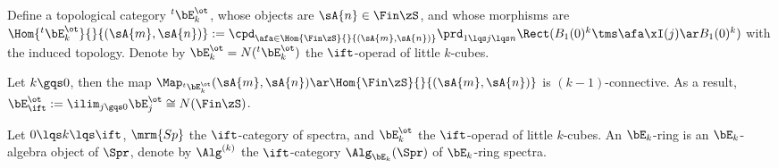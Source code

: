 \documentclass[a4paper, twoside]{article}
\begin{document}
\begin{dfn}[5.1.0.2, 5.1.0.4]
    Define a topological category ${}^{t}\bE_{k}^{\ot}$, whose objects are $\sA{n}\in\Fin\zS$, and whose morphisms are $\Hom{{}^{t}\bE_{k}^{\ot}}{}{(\sA{m},\sA{n})}:=\cpd_{\afa\in\Hom{\Fin\zS}{}{(\sA{m},\sA{n})}}\prd_{1\lqs j\lqs n}\Rect(B_{1}(0)^{k}\tms\afa\xI(j)\ar B_{1}(0)^{k})$ with the induced topology. Denote by $\bE_{k}^{\ot}=N({}^{t}\bE_{k}^{\ot})$ the $\ift$-operad of little $k$-cubes.
\end{dfn}

\begin{thm}[5.1.1.4]
    Let $k\gqs0$, then the map $\Map_{{}^{t}\bE_{k}^{\ot}}(\sA{m},\sA{n})\ar\Hom{\Fin\zS}{}{(\sA{m},\sA{n})}$ is $(k-1)$-connective. As a result, $\bE_{\ift}^{\ot}:=\ilim_{j\gqs0}\bE_{j}^{\ot}\cong N(\Fin\zS)$.
\end{thm}




\begin{dfn}[7.1.0.1]
    Let $0\lqs k\lqs \ift$, $\mrm{Sp}$ the $\ift$-category of spectra, and $\bE_{k}^{\ot}$ the $\ift$-operad of little $k$-cubes. An $\bE_{k}$-ring is an $\bE_{k}$-algebra object of $\Spr$, denote by $\Alg^{(k)}$ the $\ift$-category $\Alg_{\bE_{k}}(\Spr)$ of $\bE_{k}$-ring spectra.
\end{dfn}



\printref
\end{document}
